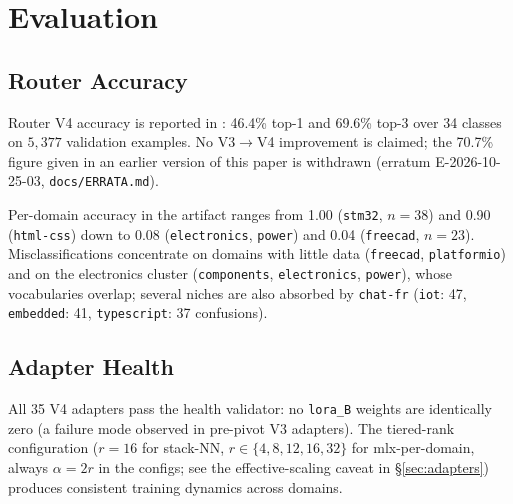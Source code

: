 \documentclass[11pt,a4paper]{article}
\begin{document}
\section{Evaluation}
\label{sec:eval}

\subsection{Router Accuracy}

Router V4 accuracy is reported in : 46.4\% top-1 and 69.6\% top-3 over 34 classes on $5{,}377$ validation examples. No V3$\rightarrow$V4 improvement is claimed; the 70.7\% figure given in an earlier version of this paper is withdrawn (erratum E-2026-10-25-03, \texttt{docs/ERRATA.md}).

Per-domain accuracy in the artifact ranges from 1.00 (\texttt{stm32}, $n = 38$) and 0.90 (\texttt{html-css}) down to 0.08 (\texttt{electronics}, \texttt{power}) and 0.04 (\texttt{freecad}, $n = 23$). Misclassifications concentrate on domains with little data (\texttt{freecad}, \texttt{platformio}) and on the electronics cluster (\texttt{components}, \texttt{electronics}, \texttt{power}), whose vocabularies overlap; several niches are also absorbed by \texttt{chat-fr} (\texttt{iot}: 47, \texttt{embedded}: 41, \texttt{typescript}: 37 confusions).

\subsection{Adapter Health}

All 35 V4 adapters pass the health validator: no \texttt{lora\_B} weights are identically zero (a failure mode observed in pre-pivot V3 adapters). The tiered-rank configuration ($r{=}16$ for stack-NN, $r \in \{4,8,12,16,32\}$ for mlx-per-domain, always $\alpha = 2r$ in the configs; see the effective-scaling caveat in \S\ref{sec:adapters}) produces consistent training dynamics across domains.
\end{document}

